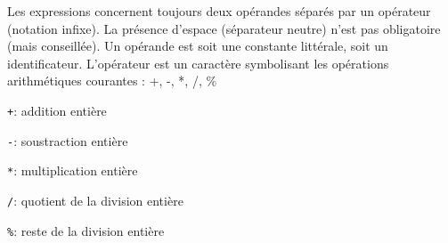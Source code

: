 Les expressions concernent toujours deux opérandes séparés par un opérateur (notation infixe).
La présence d’espace (séparateur neutre) n’est pas obligatoire (mais conseillée).
Un opérande est soit une constante littérale, soit un identificateur.
L’opérateur est un caractère symbolisant les opérations arithmétiques courantes : +, -, *, /, \% \\

\begin{description}
	\item \verb|+|: addition entière
	\item \verb|-|: soustraction entière
	\item \verb|*|: multiplication entière
	\item \verb|/|: quotient de la division entière
	\item \verb|%|: reste de la division entière 
\end{description}